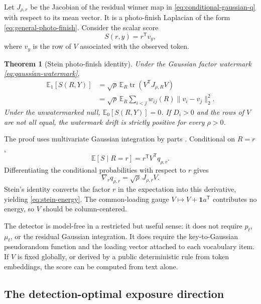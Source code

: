 \documentclass[11pt]{article}
\newtheorem{theorem}{Theorem}[section]
\theoremstyle{definition}
\theoremstyle{remark}
\DeclareMathOperator{\tr}{tr}
\newcommand{\E}{\mathbb{E}}
\newcommand{\one}{\mathbf{1}}
\newcommand{\trans}{\mathsf{T}}
\begin{document}
Let $J_{\rho,r}$ be the Jacobian of the residual winner map in \eqref{eq:conditional-gaussian-q} with respect to its mean vector. It is a photo-finish Laplacian of the form \eqref{eq:general-photo-finish}. Consider the scalar score
\begin{equation}
S(r,y)=r^\trans v_y,
\label{eq:linear-score}
\end{equation}
where $v_y$ is the row of $V$ associated with the observed token.

\begin{theorem}[Stein photo-finish identity]
\label{thm:stein}
Under the Gaussian factor watermark \eqref{eq:gaussian-watermark},
\begin{equation}
\begin{split}
\E_1[S(R,Y)]
&=\sqrt{\rho}\,\E_R\tr\!\left(V^\trans J_{\rho,R}V\right)\\
&=\sqrt{\rho}\,\E_R
\sum_{i<j}w_{ij}(R)\|v_i-v_j\|_2^2.
\end{split}
\label{eq:stein-energy}
\end{equation}
Under the unwatermarked null, $\E_0[S(R,Y)]=0$. If $D_i>0$ and the rows of $V$ are not all equal, the watermark drift is strictly positive for every $\rho>0$.
\end{theorem}

The proof uses multivariate Gaussian integration by parts \citep{stein1981mean}. Conditional on $R=r$,
\begin{equation}
\E[S\mid R=r]=r^\trans V^\trans q_{\rho,r}.
\end{equation}
Differentiating the conditional probabilities with respect to $r$ gives
\begin{equation}
\nabla_r q_{\rho,r}=\sqrt{\rho}\,J_{\rho,r}V.
\end{equation}
Stein's identity converts the factor $r$ in the expectation into this derivative, yielding \eqref{eq:stein-energy}. The common-loading gauge $V\mapsto V+\one a^\trans$ contributes no energy, so $V$ should be column-centered.

The detector is model-free in a restricted but useful sense: it does not require $p_t$, $\mu_t$, or the residual Gaussian integration. It does require the key-to-Gaussian pseudorandom function and the loading vector attached to each vocabulary item. If $V$ is fixed globally, or derived by a public deterministic rule from token embeddings, the score can be computed from text alone.

\subsection{The detection-optimal exposure direction}
\end{document}
